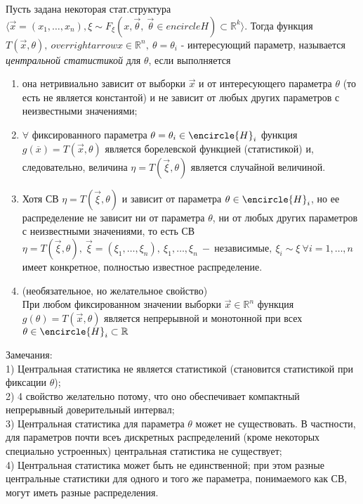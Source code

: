 \begin{defs}
  Пусть задана некоторая стат.структура
  $\langle\overrightarrow{x}=(x_1,\ldots,x_n),\xi\sim F_{\xi}(x,\overrightarrow{\theta}, \ \overrightarrow{\theta} \in encircle{H}) \subset \mathbb{R}^k \rangle$.
  Тогда функция $T(\overrightarrow{x}, \theta), \ overrightarrow{x} \in \mathbb{R}^n, \ \theta=\theta_i$ - интересующий параметр, называется
  \textit{центральной статистикой} для $\theta$, если выполняется
  \begin{enumerate}
    \item она нетривиально зависит от выборки $\overrightarrow{x}$ и от интересующего параметра $\theta$ (то есть не является константой)
    и не зависит от любых других параметров с неизвестными значениями;
    \item $\forall$ фиксированного параметра $\theta = \theta_i \in \encircle{H}_i$ функция $g(\overline{x})=T(\overrightarrow{x}, \theta)$
    является борелевской функцией (статистикой) и, следовательно, величина $\eta=T(\overrightarrow{\xi}, \theta)$ является случайной величиной.
    \item Хотя СВ $\eta=T(\overrightarrow{\xi}, \theta)$ и зависит от параметра $\theta \in \encircle{H}_i$, но ее распределение
    не зависит ни от параметра $\theta$, ни от любых других параметров с неизвестными значениями, то есть СВ $\eta=T(\overrightarrow{\xi}, \theta), \
    \overrightarrow{\xi}=(\xi_1,\ldots,\xi_n), \ \xi_1,\ldots,\xi_n \ - \ \text{независимые}, \ \xi_i \sim \xi \ \forall i = 1,\ldots,n$ имеет
    конкретное, полностью известное распределение.
    \item (необязательное, но желательное свойство)\\
    При любом фиксированном значении выборки $\overrightarrow{x} \in \mathbb{R}^n$ функция $g(\theta)=T(\overrightarrow{x},\theta)$ является
    непрерывной и монотонной при всех $\theta \in \encircle{H}_i \subset \mathbb{R}$
  \end{enumerate}
\end{defs}

Замечания:\\
1) Центральная статистика не является статистикой (становится статистикой при фиксации $\theta$);\\
2) 4 свойство желательно потому, что оно обеспечивает компактный непрерывный доверительный интервал;\\
3) Центральная статистика для параметра $\theta$ может не существовать. В частности, для параметров почти всеъ дискретных распределений
(кроме некоторых специально устроенных) центральная статистика не существует;\\
4) Центральная статистика может быть не единственной; при этом разные центральные статистики для одного и того же параметра,
понимаемого как СВ, могут иметь разные распределения.\\

